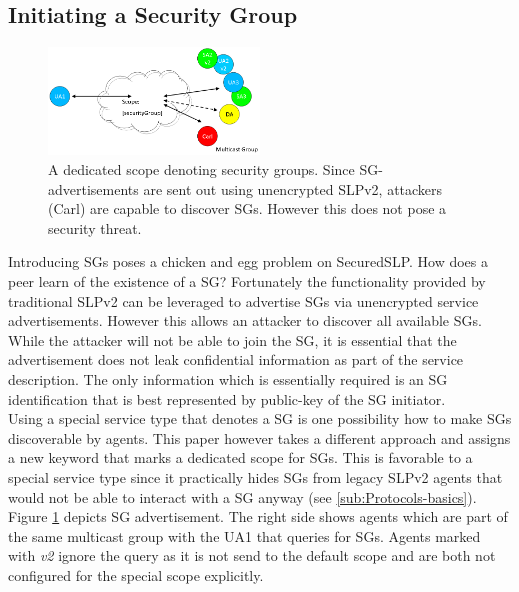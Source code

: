 \subsection{Initiating a Security Group}
\begin{figure}[!h]
\centering\includegraphics[width=0.5\textwidth]{Images/security-group_scope}
\caption{\label{fig:SecurityGroup-Scope}A dedicated scope denoting security groups. Since SG-advertisements are sent out using unencrypted SLPv2, attackers (Carl) are capable to discover SGs. However this does not pose a security threat.}
\end{figure}\noindent
Introducing SGs poses a chicken and egg problem on SecuredSLP. How does a peer learn of the existence of a SG? Fortunately the functionality provided by traditional SLPv2 can be leveraged to advertise SGs via unencrypted service advertisements. However this allows an attacker to discover all available SGs. While the attacker will not be able to join the SG, it is essential that the advertisement does not leak confidential information as part of the service description. The only information which is essentially required is an SG identification that is best represented by public-key of the SG initiator.\\
Using a special service type that denotes a SG is one possibility how to make SGs discoverable by agents. This paper however takes a different approach and assigns a new keyword that marks a dedicated scope for SGs. This is favorable to a special service type since it practically hides SGs from legacy SLPv2 agents that would not be able to interact with a SG anyway (see \ref{sub:Protocols-basics}). Figure \ref{fig:SecurityGroup-Scope} depicts SG advertisement. The right side shows agents which are part of the same multicast group with the UA1 that queries for SGs. Agents marked with \emph{v2} ignore the query as it is not send to the default scope and are both not configured for the special scope explicitly.

